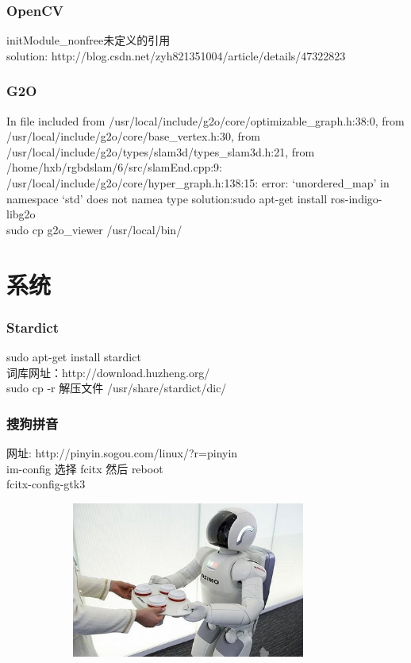 \documentclass{beamer}
\begin{document}
\begin{CJK}{UTF8}{gkai}
    \begin{frame}\frametitle{OpenCV}
        initModule\_nonfree未定义的引用\\
        solution: http://blog.csdn.net/zyh821351004/article/details/47322823
    \end{frame}

    \begin{frame}\frametitle{G2O}
        In file included from /usr/local/include/g2o/core/optimizable\_graph.h:38:0,
        from /usr/local/include/g2o/core/base\_vertex.h:30,
        from /usr/local/include/g2o/types/slam3d/types\_slam3d.h:21,
        from /home/hxb/rgbdslam/6/src/slamEnd.cpp:9:
        /usr/local/include/g2o/core/hyper\_graph.h:138:15: error:
        ‘unordered\_map’ in namespace ‘std’ does not namea type
        solution:sudo apt-get install ros-indigo-libg2o\\
        sudo cp g2o\_viewer /usr/local/bin/
    \end{frame}

    \section{系统}

    \begin{frame}\frametitle{Stardict}
        sudo apt-get install stardict\\
        词库网址：http://download.huzheng.org/\\
        sudo cp -r 解压文件 /usr/share/stardict/dic/
    \end{frame}

    \begin{frame}\frametitle{搜狗拼音}
        网址: http://pinyin.sogou.com/linux/?r=pinyin\\
        im-config 选择 fcitx 然后 reboot\\
        fcitx-config-gtk3\\
        \begin{figure}
            \centering
            \includegraphics[width=10.00cm,height=5.10cm]{test.png}
        \end{figure}
    \end{frame}


\end{CJK}
\end{document}
